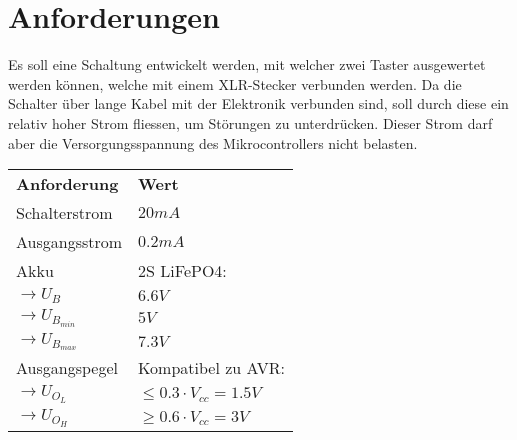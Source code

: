 
\section{Anforderungen}
Es soll eine Schaltung entwickelt werden, mit welcher zwei Taster ausgewertet 
werden können, welche mit einem XLR-Stecker verbunden werden. Da die Schalter 
über lange Kabel mit der Elektronik verbunden sind, soll durch diese ein 
relativ hoher Strom fliessen, um Störungen zu unterdrücken. Dieser Strom darf 
aber die Versorgungsspannung des Mikrocontrollers nicht belasten. 

\begin{table}[h!]
  \begin{tabular}{@{}ll}
    \textbf{Anforderung}        & \textbf{Wert} \\
    Schalterstrom               & $20 mA$ \\
    Ausgangsstrom               & $0.2 mA$ \\
    Akku                        & 2S LiFePO4: \\
    $\rightarrow U_B$           & $6.6 V$ \\
    $\rightarrow U_{B_{min}}$   & $5 V$ \\
    $\rightarrow U_{B_{max}}$   & $7.3 V$ \\
    Ausgangspegel               & Kompatibel zu AVR: \\
    $\rightarrow U_{O_L}$       & $\leq 0.3 \cdot V_{cc} = 1.5 V$ \\
    $\rightarrow U_{O_H}$       & $\geq 0.6 \cdot V_{cc} = 3 V$ \\
    
  \end{tabular}
\end{table}

